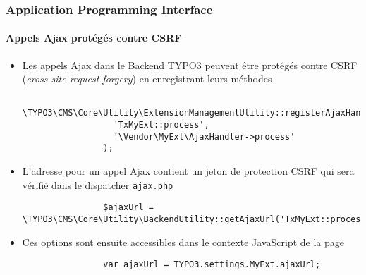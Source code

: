 \begin{frame}[fragile]
	\frametitle{Application Programming Interface}
	\framesubtitle{Appels Ajax protégés contre CSRF}

	\lstset{
		basicstyle=\tiny\ttfamily
	}

	\begin{itemize}
		\item Les appels Ajax dans le Backend TYPO3 peuvent être protégés contre CSRF (\textit{cross-site request forgery}) en enregistrant leurs méthodes

			\begin{lstlisting}
				\TYPO3\CMS\Core\Utility\ExtensionManagementUtility::registerAjaxHandler(
				  'TxMyExt::process',
				  '\Vendor\MyExt\AjaxHandler->process'
				);
			\end{lstlisting}

		\item L'adresse pour un appel Ajax contient un jeton de protection CSRF qui sera vérifié dans le dispatcher \texttt{ajax.php}

			\begin{lstlisting}
				$ajaxUrl = \TYPO3\CMS\Core\Utility\BackendUtility::getAjaxUrl('TxMyExt::process');
			\end{lstlisting}

		\item Ces options sont ensuite accessibles dans le contexte JavaScript de la page

			\begin{lstlisting}
				var ajaxUrl = TYPO3.settings.MyExt.ajaxUrl;
			\end{lstlisting}

	\end{itemize}

\end{frame}


